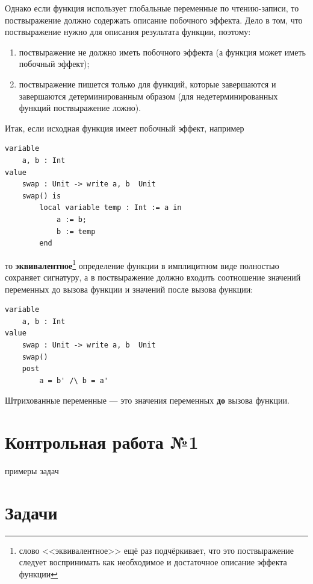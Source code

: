 \documentclass[14pt, twoside]{extreport}
\begin{document}
Однако если функция использует глобальные переменные по чтению-записи, то поствыражение должно содержать описание побочного эффекта. Дело в том, что поствыражение нужно для описания результата функции, поэтому:
\begin{enumerate}
\item поствыражение не должно иметь побочного эффекта (а функция может иметь побочный эффект);
\item поствыражение пишется только для функций, которые завершаются и завершаются детерминированным образом (для недетерминированных функций поствыражение ложно).
\end{enumerate}

Итак, если исходная функция имеет побочный эффект, например
\begin{lstlisting}
variable
	a, b : Int
value
	swap : Unit -> write a, b  Unit
	swap() is
		local variable temp : Int := a in
			a := b;
			b := temp
		end
\end{lstlisting} 
то \textbf{эквивалентное}\footnote{слово <<эквивалентное>> ещё раз подчёркивает, что это поствыражение следует воспринимать как необходимое и достаточное описание эффекта функции} определение функции в имплицитном виде полностью сохраняет сигнатуру, а в поствыражение должно входить соотношение значений переменных до вызова функции и значений после вызова функции:
\begin{lstlisting}
variable
	a, b : Int
value
	swap : Unit -> write a, b  Unit
	swap()
	post
		a = b' /\ b = a'
\end{lstlisting}

Штрихованные переменные --- это значения переменных \textbf{до} вызова функции.

\section{Контрольная работа №1}

примеры задач



    \section*{Задачи}

    
\end{document}
